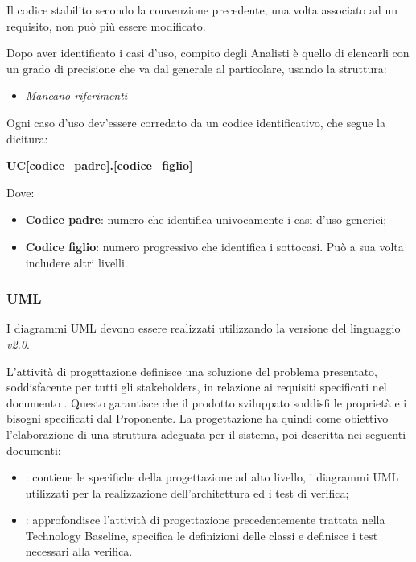                     \noindent Il codice stabilito secondo la convenzione precedente, una volta associato ad un requisito, non può più essere modificato.
                    
                                Dopo aver identificato i casi d'uso, compito degli Analisti è quello di elencarli con un grado di precisione che va dal generale al particolare, usando la struttura:
                \begin{itemize}
                \item{\textit{Mancano riferimenti}}
                \end{itemize}

                \noindent Ogni caso d'uso dev'essere corredato da un codice identificativo, che segue la dicitura: 
                \begin{center}
                \textbf{UC[codice\_padre].[codice\_figlio]}
                \end{center}
                
                \noindent Dove:
                \begin{itemize}
                 	\item{\textbf{Codice padre}: numero che identifica univocamente i casi d'uso generici;}
			\item{\textbf{Codice figlio}: numero progressivo che identifica i sottocasi. Può a sua volta includere altri livelli.}
                \end{itemize}
                                
                \subsubsection*{UML}
                I diagrammi UML devono essere realizzati utilizzando la versione del linguaggio \textit{v2.0}.
                
            L'attività di progettazione definisce una soluzione del problema presentato, soddisfacente per tutti gli stakeholders, in relazione ai requisiti specificati nel documento \AdR{}. Questo garantisce che il prodotto sviluppato soddisfi le proprietà e i bisogni specificati dal Proponente. 
            La progettazione ha quindi come obiettivo l'elaborazione di una struttura adeguata per il sistema, poi descritta nei seguenti documenti:
            \begin{itemize}
            	\item{\textbf{\TB{}}: contiene le specifiche della progettazione ad alto livello, i diagrammi UML utilizzati per la realizzazione dell'architettura ed i test di verifica;}
		\item{\textbf{\PB{}}: approfondisce l'attività di progettazione precedentemente trattata nella Technology Baseline, specifica le definizioni delle classi e definisce i test necessari alla verifica.}
	     \end{itemize}
	     
